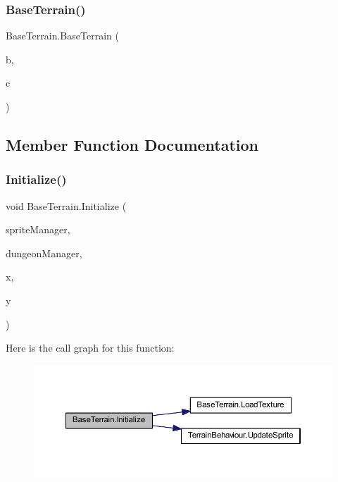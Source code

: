 \subsubsection{\texorpdfstring{BaseTerrain()}{BaseTerrain()}}
{\footnotesize\ttfamily Base\+Terrain.\+Base\+Terrain (\begin{DoxyParamCaption}\item[{\mbox{\hyperlink{class_biome}{Biome}}}]{b,  }\item[{string}]{c }\end{DoxyParamCaption})}



\subsection{Member Function Documentation}
\mbox{\label{class_base_terrain_aff9e343986e2b76d0fc22be3a5e246dc}} 
\subsubsection{\texorpdfstring{Initialize()}{Initialize()}}
{\footnotesize\ttfamily void Base\+Terrain.\+Initialize (\begin{DoxyParamCaption}\item[{\mbox{\hyperlink{class_sprite_manager}{Sprite\+Manager}}}]{sprite\+Manager,  }\item[{\mbox{\hyperlink{class_dungeon_manager}{Dungeon\+Manager}}}]{dungeon\+Manager,  }\item[{int}]{x,  }\item[{int}]{y }\end{DoxyParamCaption})}

Here is the call graph for this function\+:
\nopagebreak
\begin{figure}[H]
\begin{center}
\leavevmode
\includegraphics[width=350pt]{class_base_terrain_aff9e343986e2b76d0fc22be3a5e246dc_cgraph}
\end{center}
\end{figure}
\mbox{\label{class_base_terrain_ada3cddbd511be2890cbb9635d997441b}} 
